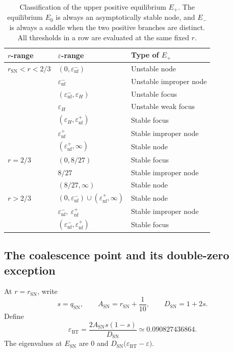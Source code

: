 \documentclass[11pt,reqno]{amsart}
\theoremstyle{plain}
\theoremstyle{definition}
\theoremstyle{remark}
\begin{document}
\begin{table}[htbp]
\centering
\small
\renewcommand{\arraystretch}{1.16}
\caption{
Classification of the upper positive equilibrium $E_+$.
The equilibrium $E_0$ is always an asymptotically stable node,
and $E_-$ is always a saddle when the two positive branches
are distinct. All thresholds in a row are evaluated at the
same fixed $r$.
}
\label{tab:bl-equilibrium-classification}
\begin{tabular}{@{}lll@{}}
\toprule
$r$-range
&
$\varepsilon$-range
&
Type of $E_+$
\\
\midrule
$r_{\mathrm{SN}}<r<2/3$
&
$(0,\varepsilon_{\mathrm{nf}}^-)$
&
Unstable node
\\
&
$\varepsilon_{\mathrm{nf}}^-$
&
Unstable improper node
\\
&
$(\varepsilon_{\mathrm{nf}}^-,\varepsilon_H)$
&
Unstable focus
\\
&
$\varepsilon_H$
&
Unstable weak focus
\\
&
$(\varepsilon_H,\varepsilon_{\mathrm{nf}}^+)$
&
Stable focus
\\
&
$\varepsilon_{\mathrm{nf}}^+$
&
Stable improper node
\\
&
$(\varepsilon_{\mathrm{nf}}^+,\infty)$
&
Stable node
\\
\midrule
$r=2/3$
&
$(0,8/27)$
&
Stable focus
\\
&
$8/27$
&
Stable improper node
\\
&
$(8/27,\infty)$
&
Stable node
\\
\midrule
$r>2/3$
&
$(0,\varepsilon_{\mathrm{nf}}^-)
\cup
(\varepsilon_{\mathrm{nf}}^+,\infty)$
&
Stable node
\\
&
$\varepsilon_{\mathrm{nf}}^-,
\ \varepsilon_{\mathrm{nf}}^+$
&
Stable improper node
\\
&
$(\varepsilon_{\mathrm{nf}}^-,
\varepsilon_{\mathrm{nf}}^+)$
&
Stable focus
\\
\bottomrule
\end{tabular}
\end{table}

\subsection{The coalescence point and its double-zero exception}
\label{subsec:bl-fold}

At $r=r_{\mathrm{SN}}$, write
\[
s=q_{\mathrm{SN}},
\qquad
A_{\mathrm{SN}}=r_{\mathrm{SN}}+\frac{1}{10},
\qquad
D_{\mathrm{SN}}=1+2s.
\]
Define
\begin{equation}
\varepsilon_{\mathrm{BT}}
=
\frac{
2A_{\mathrm{SN}}s(1-s)
}{
D_{\mathrm{SN}}
}
\simeq0.090827436864.
\label{eq:bl-BT-parameter}
\end{equation}
The eigenvalues at $E_{\mathrm{SN}}$ are
$
0$
and
$D_{\mathrm{SN}}
\bigl(
\varepsilon_{\mathrm{BT}}-\varepsilon
\bigr).
\label{eq:bl-fold-eigenvalues}
$
\end{document}

